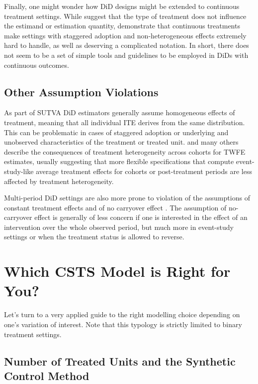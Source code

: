 \documentclass[hidelinks]{article}\usepackage[]{graphicx}\usepackage[]{xcolor}
\begin{document}
Finally, one might wonder how DiD designs might be extended to continuous treatment settings. While \textcite{Angrist2009} suggest that the type of treatment does not influence the estimand or estimation quantity, \textcite{Callaway2021} demonstrate that continuous treatments make settings with staggered adoption and non-heterogeneous effects extremely hard to handle, as well as deserving a complicated notation. In short, there does not seem to be a set of simple tools and guidelines to be employed in DiDs with continuous outcomes.


\subsection{Other Assumption Violations}


As part of SUTVA DiD estimators generally assume homogeneous effects of treatment, meaning that all individual ITE derives from the same distribution. This can be problematic in cases of staggered adoption or underlying and unobserved characteristics of the treatment or treated unit. \textcite{GoodmanBacon2021} and many others describe the consequences of treatment heterogeneity across cohorts for TWFE estimates, usually suggesting that more flexible specifications that compute event-study-like average treatment effects for cohorts or post-treatment periods are less affected by treatment heterogeneity.

Multi-period DiD settings are also more prone to violation of the assumptions of constant treatment effects and of no carryover effect \parencite[i.e. past treatments affect current outcomes][]{Liu}. The assumption of no-carryover effect is generally of less concern if one is interested in the effect of an intervention over the whole observed period, but much more in event-study settings or when the treatment status is allowed to reverse.


\section{Which CSTS Model is Right for You?}

Let's turn to a very applied guide to the right modelling choice depending on one's variation of interest. Note that this typology is strictly limited to binary treatment settings.

\subsection{Number of Treated Units and the Synthetic Control Method}
\end{document}
